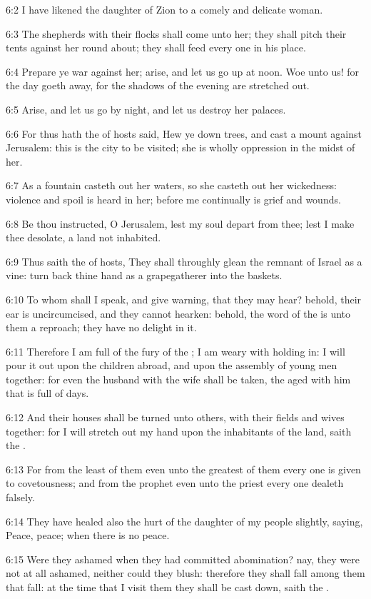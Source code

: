 6:2 I have likened the daughter of Zion to a comely and delicate
woman.

6:3 The shepherds with their flocks shall come unto her; they shall
pitch their tents against her round about; they shall feed every one
in his place.

6:4 Prepare ye war against her; arise, and let us go up at noon. Woe
unto us! for the day goeth away, for the shadows of the evening are
stretched out.

6:5 Arise, and let us go by night, and let us destroy her palaces.

6:6 For thus hath the \LORD of hosts said, Hew ye down trees, and cast
a mount against Jerusalem: this is the city to be visited; she is
wholly oppression in the midst of her.

6:7 As a fountain casteth out her waters, so she casteth out her
wickedness: violence and spoil is heard in her; before me continually
is grief and wounds.

6:8 Be thou instructed, O Jerusalem, lest my soul depart from thee;
lest I make thee desolate, a land not inhabited.

6:9 Thus saith the \LORD of hosts, They shall throughly glean the
remnant of Israel as a vine: turn back thine hand as a grapegatherer
into the baskets.

6:10 To whom shall I speak, and give warning, that they may hear?
behold, their ear is uncircumcised, and they cannot hearken: behold,
the word of the \LORD is unto them a reproach; they have no delight in
it.

6:11 Therefore I am full of the fury of the \LORD; I am weary with
holding in: I will pour it out upon the children abroad, and upon the
assembly of young men together: for even the husband with the wife
shall be taken, the aged with him that is full of days.

6:12 And their houses shall be turned unto others, with their fields
and wives together: for I will stretch out my hand upon the
inhabitants of the land, saith the \LORD.

6:13 For from the least of them even unto the greatest of them every
one is given to covetousness; and from the prophet even unto the
priest every one dealeth falsely.

6:14 They have healed also the hurt of the daughter of my people
slightly, saying, Peace, peace; when there is no peace.

6:15 Were they ashamed when they had committed abomination? nay, they
were not at all ashamed, neither could they blush: therefore they
shall fall among them that fall: at the time that I visit them they
shall be cast down, saith the \LORD.


